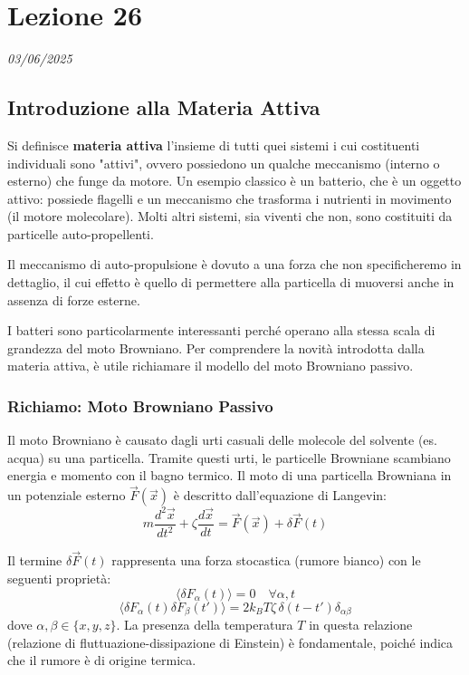 \chapter{Lezione 26}
\label{capitolo_26}
\textit{03/06/2025}


\section{Introduzione alla Materia Attiva}

Si definisce \textbf{materia attiva} l'insieme di tutti quei sistemi i cui costituenti individuali sono "attivi", ovvero possiedono un qualche meccanismo (interno o esterno) che funge da motore. Un esempio classico è un batterio, che è un oggetto attivo: possiede flagelli e un meccanismo che trasforma i nutrienti in movimento (il motore molecolare). Molti altri sistemi, sia viventi che non, sono costituiti da particelle auto-propellenti.

Il meccanismo di auto-propulsione è dovuto a una forza che non specificheremo in dettaglio, il cui effetto è quello di permettere alla particella di muoversi anche in assenza di forze esterne.

I batteri sono particolarmente interessanti perché operano alla stessa scala di grandezza del moto Browniano. Per comprendere la novità introdotta dalla materia attiva, è utile richiamare il modello del moto Browniano passivo.

\subsection{Richiamo: Moto Browniano Passivo}
Il moto Browniano è causato dagli urti casuali delle molecole del solvente (es. acqua) su una particella. Tramite questi urti, le particelle Browniane scambiano energia e momento con il bagno termico. Il moto di una particella Browniana in un potenziale esterno $\vec{F}(\vec{x})$ è descritto dall'equazione di Langevin:
\begin{equation}
    m\frac{d^{2}\vec{x}}{dt^{2}} + \zeta\frac{d\vec{x}}{dt} = \vec{F}(\vec{x}) + \delta\vec{F}(t)
\end{equation}


Il termine $\delta\vec{F}(t)$ rappresenta una forza stocastica (rumore bianco) con le seguenti proprietà:
\begin{equation}
    \langle \delta F_{\alpha}(t) \rangle = 0 \quad \forall \alpha, t
\end{equation}
\begin{equation}
    \langle \delta F_{\alpha}(t) \delta F_{\beta}(t') \rangle = 2k_{B}T\zeta \, \delta(t-t') \delta_{\alpha\beta} \label{eq:fluct-dissip}
\end{equation}
dove $\alpha, \beta \in \{x, y, z\}$. La presenza della temperatura $T$ in questa relazione (relazione di fluttuazione-dissipazione di Einstein) è fondamentale, poiché indica che il rumore è di origine termica.

